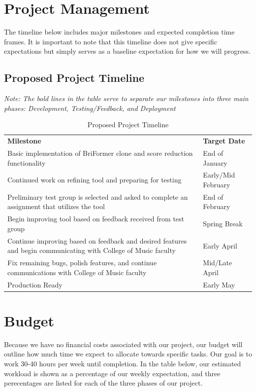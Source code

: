 \documentclass[12pt, letterpaper]{article}
\begin{document}
\section*{Project Management}
The timeline below includes major milestones and expected completion time frames.  It is important to note that this timeline does not give specific expectations but simply serves as a baseline expectation for how we will progress.

\subsection*{Proposed Project Timeline}
\textit{Note: The bold lines in the table serve to separate our milestones into three main phases: Development, Testing/Feedback, and Deployment}
\begin{table}[h!]
\caption{Proposed Project Timeline}
\centering
\begin{tabular}{|p{8cm}|p{4cm}|}
\hline
\textbf{Milestone} & \textbf{Target Date} \\
\Xhline{4\arrayrulewidth}
Basic implementation of BriFormer clone and score reduction functionality & End of January \\
\hline
Continued work on refining tool and preparing for testing & Early/Mid February \\
\Xhline{4\arrayrulewidth}
Preliminary test group is selected and asked to complete an assignment that utilizes the tool & End of February \\
\hline
Begin improving tool based on feedback received from test group & Spring Break \\
\Xhline{4\arrayrulewidth}
Continue improving based on feedback and desired features and begin communicating with College of Music faculty & Early April \\
\hline
Fix remaining bugs, polish features, and continue communications with College of Music faculty & Mid/Late April \\
\hline
Production Ready & Early May \\
\hline
\end{tabular}
\end{table}

\pagebreak

\section*{Budget}
Because we have no financial costs associated with our project, our budget will outline how much time we expect to allocate towards specific tasks.  Our goal is to work 30-40 hours per week until completion.  In the table below, our estimated workload is shown as a percentage of our weekly expectation, and three perecentages are listed for each of the three phases of our project.  
\end{document}
